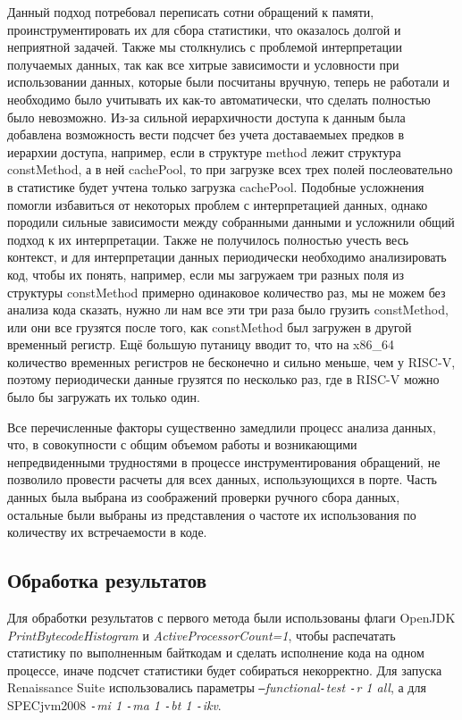 Данный подход потребовал переписать сотни обращений к памяти, проинструментировать их для сбора статистики, что оказалось долгой и неприятной задачей. Также мы столкнулись с проблемой интерпретации получаемых данных, так как все хитрые зависимости и условности при использовании данных, которые были посчитаны вручную, теперь не работали и необходимо было учитывать их как-то автоматически, что сделать полностью было невозможно. Из-за сильной иерархичности доступа к данным была добавлена возможность вести подсчет без учета доставаемыех предков в иерархии доступа, например, если в структуре method лежит структура constMethod, а в ней cachePool, то при загрузке всех трех полей послеовательно в статистике будет учтена только загрузка cachePool. Подобные усложнения помогли избавиться от некоторых проблем с интерпретацией данных, однако породили сильные зависимости между собранными данными и усложнили общий подход к их интерпретации. Также не получилось полностью учесть весь контекст, и для интерпретации данных периодически необходимо анализировать код, чтобы их понять, например, если мы загружаем три разных поля из структуры constMethod примерно одинаковое количество раз, мы не можем без анализа кода сказать, нужно ли нам все эти три раза было грузить constMethod, или они все грузятся после того, как constMethod был загружен в другой временный регистр. Ещё большую путаницу вводит то, что на x86\_64 количество временных регистров не бесконечно и сильно меньше, чем у RISC-V, поэтому периодически данные грузятся по несколько раз, где в RISC-V можно было бы загружать их только один.

Все перечисленные факторы существенно замедлили процесс анализа данных, что, в совокупности с общим объемом работы и возникающими непредвиденными трудностями в процессе инструментирования обращений, не позволило провести расчеты для всех данных, использующихся в порте. Часть данных была выбрана из соображений проверки ручного сбора данных, остальные были выбраны из представления о частоте их использования по количеству их встречаемости в коде.



\subsection{Обработка результатов}

Для обработки результатов с первого метода были использованы флаги OpenJDK \textit{PrintBytecodeHistogram} и \textit{ActiveProcessorCount=1}, чтобы распечатать статистику по выполненным байткодам и сделать исполнение кода на одном процессе, иначе подсчет статистики будет собираться некорректно. Для запуска Renaissance Suite использовались параметры \textit{\texttt{--}functional\texttt{-}test \texttt{-}r 1 all}, а для SPECjvm2008 \textit{\texttt{-}mi 1 \texttt{-}ma 1 \texttt{-}bt 1 \texttt{-}ikv}.

